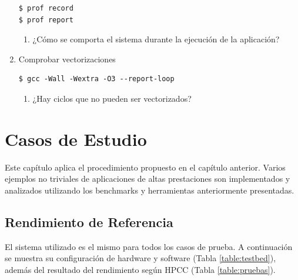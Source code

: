\documentclass[a4paper]{report}
\begin{document}
\begin{enumerate}
\begin{lstlisting}
$ prof record
$ prof report
\end{lstlisting}

\begin{enumerate}
\item ¿Cómo se comporta el sistema durante la ejecución de la aplicación?
\end{enumerate}

\item Comprobar vectorizaciones

\begin{lstlisting}
$ gcc -Wall -Wextra -O3 --report-loop
\end{lstlisting}

\begin{enumerate}
\item ¿Hay ciclos que no pueden ser vectorizados?
\end{enumerate}

\end{enumerate}

\chapter{Casos de Estudio}\label{chapter:cases}

Este capítulo aplica el procedimiento propuesto en el capítulo anterior. Varios ejemplos no triviales de aplicaciones de altas prestaciones son implementados
y analizados utilizando los benchmarks y herramientas anteriormente presentadas.

\section{Rendimiento de Referencia}

El sistema utilizado es el mismo para todos los casos de prueba. A continuación se muestra su configuración de hardware y software (Tabla \ref{table:testbed}), además del resultado del rendimiento según HPCC (Tabla \ref{table:pruebas}).
\end{document}
